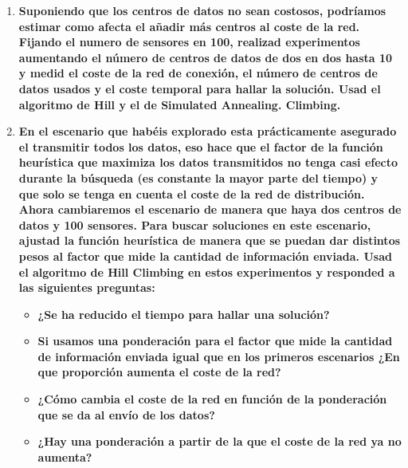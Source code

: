 \documentclass{article}
\begin{document}
\begin{enumerate}
  \item \textbf{Suponiendo que los centros de datos no sean costosos, podríamos estimar como afecta el añadir más centros al coste de la red. Fijando el numero de sensores en 100, realizad experimentos aumentando el número de centros de datos de dos en dos hasta 10 y medid el coste de la red de conexión, el número de centros de datos usados y el coste temporal para hallar la solución. Usad el algoritmo de Hill y el de Simulated Annealing. Climbing.}

  \item \textbf{En el escenario que habéis explorado esta prácticamente asegurado el transmitir todos los datos, eso hace que el factor de la función heurística que maximiza los datos transmitidos no tenga casi efecto durante la búsqueda (es constante la mayor parte del tiempo) y que solo se tenga en cuenta el coste de la red de distribución. Ahora cambiaremos el escenario de manera que haya dos centros de datos y 100 sensores. Para buscar soluciones en este escenario, ajustad la función heurística de manera que se puedan dar distintos pesos al factor que mide la cantidad de información enviada. Usad el algoritmo de Hill Climbing en estos experimentos y responded a las siguientes preguntas:}
  \begin{itemize}
    \item \textbf{¿Se ha reducido el tiempo para hallar una solución?}
    \item \textbf{Si usamos una ponderación para el factor que mide la cantidad de información enviada igual que en los primeros escenarios ¿En que proporción aumenta el coste de la red?}
    \item \textbf{¿Cómo cambia el coste de la red en función de la ponderación que se da al envío de los datos?}
    \item \textbf{¿Hay una ponderación a partir de la que el coste de la red ya no aumenta?}
  \end{itemize}
\end{enumerate}
\end{document}
